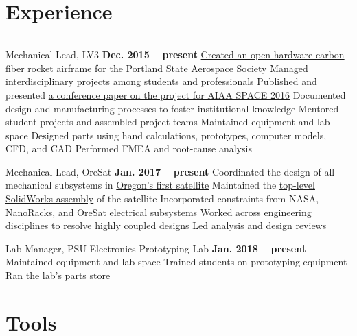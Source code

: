 \section{Experience}
\noindent\rule{\textwidth}{\hlinewidth}
	\begin{innerlist}
	\item Mechanical Lead, LV3 
		\hfill\textbf{Dec. 2015 -- present} %
		\subitem \href{https://github.com/psas/sw-cad-airframe-lv3.0}{Created 
			an open-hardware carbon fiber rocket airframe} for the 
			\href{http://psas.pdx.edu/}{Portland State Aerospace Society}
		\subitem Managed interdisciplinary projects among students and professionals
		\subitem Published and presented \href{http://arc.aiaa.org/doi/pdf/10.2514/6.2016-5365}{a conference paper on the project for AIAA SPACE 2016}
		\subitem Documented design and manufacturing processes to foster institutional knowledge
		\subitem Mentored student projects and assembled project teams
		\subitem Maintained equipment and lab space
		\subitem Designed parts using hand calculations, prototypes, computer models, CFD, and CAD
		\subitem Performed FMEA and root-cause analysis
	\item Mechanical Lead, OreSat 
		\hfill\textbf{Jan. 2017 -- present}
		\subitem Coordinated the design of all mechanical subsystems in \href{http://oresat.org/}{Oregon's first satellite}
		\subitem Maintained the \href{https://github.com/oresat/oresat-structure}{top-level SolidWorks assembly} of the satellite
		\subitem Incorporated constraints from NASA, NanoRacks, and OreSat electrical subsystems
		\subitem Worked across engineering disciplines to resolve highly coupled designs
		\subitem Led analysis and design reviews 
	\item Lab Manager, PSU Electronics Prototyping Lab
		\hfill\textbf{Jan. 2018 -- present}
		\subitem Maintained equipment and lab space
		\subitem Trained students on prototyping equipment
		\subitem Ran the lab's parts store
	\end{innerlist}
\vfill
\section{Tools}

